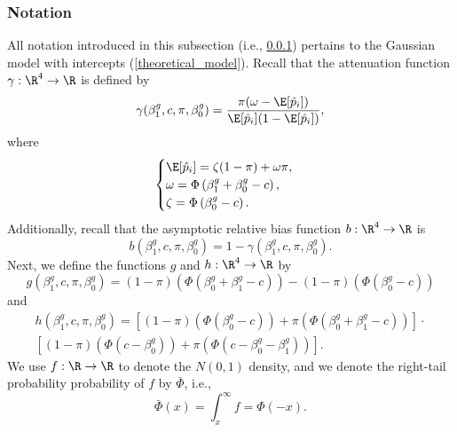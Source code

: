 \documentclass[12pt]{article}
\begin{document}


\subsubsection{Notation}\label{sec:notation}
 All notation introduced in this subsection (i.e., \ref{sec:notation}) pertains to the Gaussian model with intercepts (\ref{theoretical_model}). Recall that the attenuation function $\gamma: \R^4 \to \R$ is defined by
$$ \gamma(\beta^g_1, c, \pi, \beta^g_0) = \frac{\pi(\omega - \E[\hat{p}_i])}{ \E[\hat{p}_i](1 -\E[\hat{p}_i])},$$ where $$\begin{cases} \E[\hat{p}_i] = \zeta(1-\pi) + \omega\pi, \\
\omega = \Phi\left(\beta_1^g + \beta_0^g - c \right) ,\\ \zeta = \Phi\left( \beta^g_0 - c \right).
\end{cases}$$ Additionally, recall that the asymptotic relative bias function $b: \R^4 \to \R$ is
$$ b(\beta^g_1, c, \pi, \beta^g_0) = 1 - \gamma(\beta^g_1, c, \pi, \beta^g_0).$$ Next, we define the functions $g$ and $h: \R^4 \to \R$ by
\begin{equation}\label{def_g}
g(\beta^g_1, c, \pi, \beta^g_0) = (1-\pi)\left( \Phi(\beta_0^g + \beta_1^g - c)\right) - (1-\pi)\left(\Phi(\beta_0^g - c)\right)\end{equation}
 and
\begin{multline}\label{def_h}
h(\beta^g_1, c, \pi, \beta^g_0) = \left[(1-\pi)\left( \Phi(\beta_0^g - c)\right) + \pi\left(\Phi(\beta^g_0 + \beta^g_1 - c) \right) \right] \cdot \\ \left[(1-\pi)\left( \Phi(c - \beta^g_0) \right) + \pi\left(\Phi(c - \beta_0^g - \beta_1^g) \right) \right].
\end{multline}
We use $f:\R \to \R$ to denote the $N(0,1)$ density, and we denote the right-tail probability probability of $f$ by $\bar{\Phi}$, i.e., 
$$\bar{\Phi}(x) = \int_{x}^{\infty} f = \Phi(-x).$$
\end{document}
